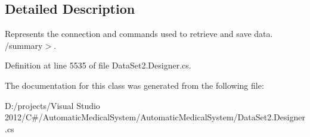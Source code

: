 \subsection{Detailed Description}
Represents the connection and commands used to retrieve and save data. /summary$>$. 

Definition at line 5535 of file DataSet2.Designer.cs.

The documentation for this class was generated from the following file:\begin{CompactItemize}
\item 
D:/projects/Visual Studio 2012/C\#/AutomaticMedicalSystem/AutomaticMedicalSystem/DataSet2.Designer.cs\end{CompactItemize}
